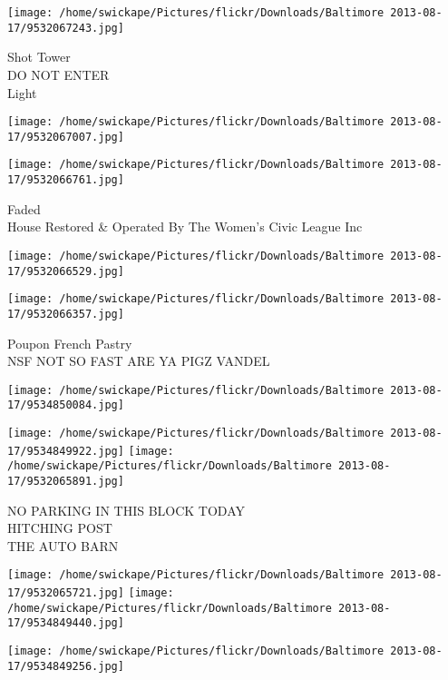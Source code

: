 \documentclass[10pt,letterpaper]{article}
\begin{document}
\texttt{[image: /home/swickape/Pictures/flickr/Downloads/Baltimore 2013-08-17/9532067243.jpg]}

Shot Tower\\
DO NOT ENTER\\
Light\\
\pagebreak

\texttt{[image: /home/swickape/Pictures/flickr/Downloads/Baltimore 2013-08-17/9532067007.jpg]}

\vspace{0.25in}
\texttt{[image: /home/swickape/Pictures/flickr/Downloads/Baltimore 2013-08-17/9532066761.jpg]}

Faded\\
House Restored \& Operated By The Women's Civic League Inc\\
\pagebreak

\texttt{[image: /home/swickape/Pictures/flickr/Downloads/Baltimore 2013-08-17/9532066529.jpg]}

\vspace{0.25in}
\texttt{[image: /home/swickape/Pictures/flickr/Downloads/Baltimore 2013-08-17/9532066357.jpg]}

Poupon French Pastry\\
NSF NOT SO FAST ARE YA PIGZ VANDEL\\
\pagebreak

\texttt{[image: /home/swickape/Pictures/flickr/Downloads/Baltimore 2013-08-17/9534850084.jpg]}

\vspace{0.25in}
\texttt{[image: /home/swickape/Pictures/flickr/Downloads/Baltimore 2013-08-17/9534849922.jpg]}
\texttt{[image: /home/swickape/Pictures/flickr/Downloads/Baltimore 2013-08-17/9532065891.jpg]}

NO PARKING IN THIS BLOCK TODAY\\
HITCHING POST\\
THE AUTO BARN\\
\pagebreak

\texttt{[image: /home/swickape/Pictures/flickr/Downloads/Baltimore 2013-08-17/9532065721.jpg]}
\texttt{[image: /home/swickape/Pictures/flickr/Downloads/Baltimore 2013-08-17/9534849440.jpg]}

\texttt{[image: /home/swickape/Pictures/flickr/Downloads/Baltimore 2013-08-17/9534849256.jpg]}
\end{document}
